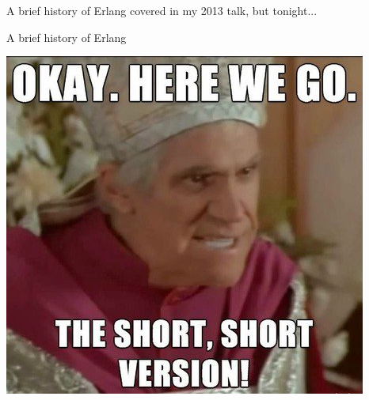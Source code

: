\documentclass[
  ignorenonframetext,
  aspectratio=169]{beamer}
\begin{document}
\begin{frame}{A brief history of Erlang}
\label{a-brief-history-of-erlang-1}
\centering
covered in my 2013 talk, but tonight...
\end{frame}

\begin{frame}{A brief history of Erlang}
\label{a-brief-history-of-erlang-2}
\begin{center}
\includegraphics[width=.5\textwidth]{./img/short_short.jpg}
\end{center}
\end{frame}
\end{document}
